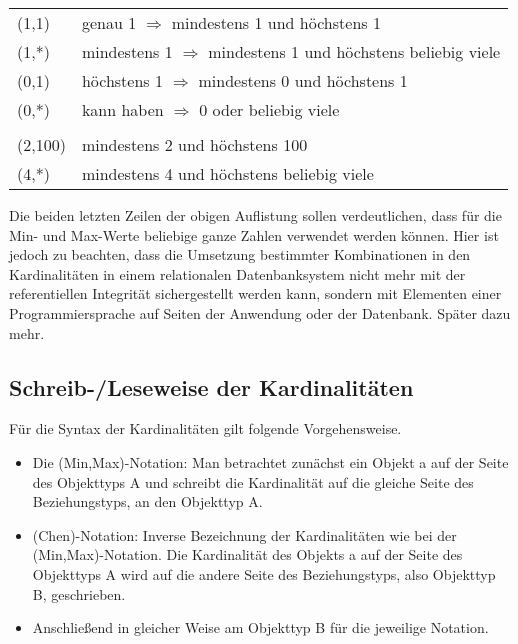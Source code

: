           \begin{supertabular}[ht]{lp{11cm}}
            (1,1) & genau 1 $\Longrightarrow$ mindestens 1 und h\"ochstens 1\\
            (1,*) & mindestens 1 $\Longrightarrow$ mindestens 1 und h\"ochstens beliebig viele\\
            (0,1) & h\"ochstens 1 $\Longrightarrow$ mindestens 0 und h\"ochstens 1\\
            (0,*) & kann haben $\Longrightarrow$ 0 oder beliebig viele\\
            \\
            (2,100) & mindestens 2 und h\"ochstens 100\\
            (4,*) & mindestens 4 und h\"ochstens beliebig viele\\
          \end{supertabular}

          Die beiden letzten Zeilen der obigen Auflistung sollen verdeutlichen, dass f\"ur die Min- und Max-Werte beliebige ganze Zahlen verwendet werden k\"onnen. Hier ist jedoch zu beachten, dass die Umsetzung bestimmter Kombinationen in den Kardinalit\"aten in einem relationalen Datenbanksystem nicht mehr mit der referentiellen Integrit\"at sichergestellt werden kann, sondern mit Elementen einer Programmiersprache auf Seiten der Anwendung oder der Datenbank. Sp\"ater dazu mehr.
          \subsection{Schreib-/Leseweise der Kardinalit\"aten}
          F\"ur die Syntax der Kardinalit\"aten gilt folgende Vorgehensweise.
          \begin{itemize}
            \item Die (Min,Max)-Notation: Man betrachtet zun\"achst ein Objekt a auf der Seite des Objekttyps A und schreibt die Kardinalit\"at auf die gleiche Seite des Beziehungstyps, an den Objekttyp A.
            \item (Chen)-Notation: Inverse Bezeichnung der Kardinalit\"aten wie bei der (Min,Max)-Notation. Die Kardinalit\"at des Objekts a auf der Seite des Objekttyps A wird auf die andere Seite des Beziehungstyps, also Objekttyp B, geschrieben.
            \item Anschlie\ss end in gleicher Weise am Objekttyp B f\"ur die jeweilige Notation.
          \end{itemize}
